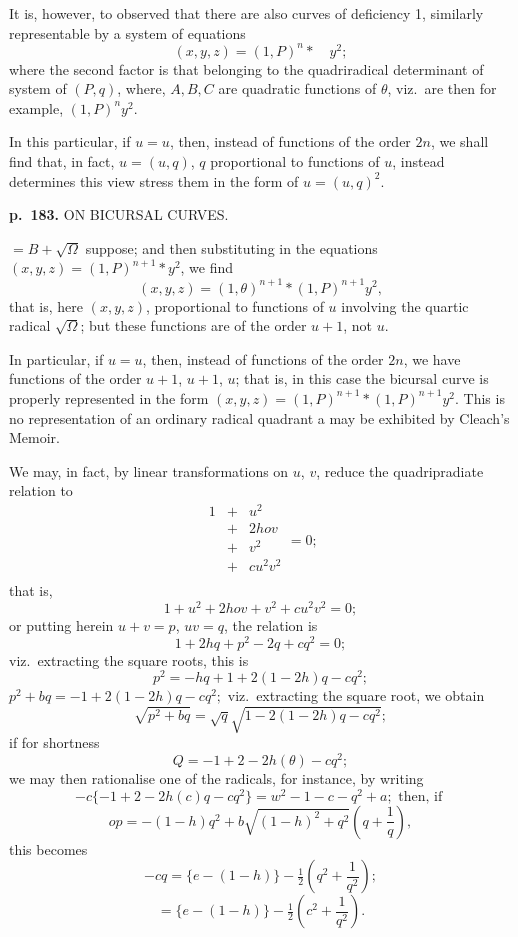 \documentclass[11pt,a4paper]{article}
\begin{document}
It is, however, to observed that there are also curves of deficiency 1, similarly representable by a system of equations
\[
(x, y, z) = (1, P)^n \ast \quad y^2;
\]
where the second factor is that belonging to the quadriradical determinant of system of $(P, q)$, where, $A, B, C$ are quadratic functions of $\theta$, viz.\ are then for example, $(1, P)^n y^2$.

In this particular, if $u = u$, then, instead of functions of the order $2n$, we shall find that, in fact, $u = (u, q)$, $q$ proportional to functions of $u$, instead determines this view stress them in the form of $u = (u, q)^2$.

\clearpage

\noindent
\textbf{p.~183.}  ON BICURSAL CURVES.

$= B + \sqrt{\Omega}$ suppose; and then substituting in the equations $(x, y, z) = (1, P)^{n+1} \ast y^2$, we find
\[
(x, y, z) = (1, \theta)^{n+1} \ast (1, P)^{n+1} y^2,
\]
that is, here $(x, y, z)$, proportional to functions of $u$ involving the quartic radical $\sqrt{\Omega}$;
but these functions are of the order $u + 1$, not $u$.

In particular, if $u = u$, then, instead of functions of the order $2n$, we have functions of the order $u + 1$, $u + 1$, $u$; that is, in this case the bicursal curve is properly represented in the form $(x, y, z) = (1, P)^{n+1} \ast (1, P)^{n+1} y^2$.  This is no representation of an ordinary radical quadrant a may be exhibited by Cleach's Memoir.

We may, in fact, by linear transformations on $u$, $v$, reduce the quadripradiate relation to
\[
\begin{matrix}
1 & + & u^2 \\
& + & 2 hov \\
& + & v^2 \\
& + & c u^2 v^2 \\
\end{matrix} = 0;
\]
that is,
\[
1 + u^2 + 2hov + v^2 + c u^2 v^2 = 0;
\]
or putting herein $u + v = p$, $uv = q$, the relation is
\[
1 + 2hq + p^2 - 2q + c q^2 = 0;
\]
viz.\ extracting the square roots, this is
\[
p^2 = -hq + 1 + 2(1 - 2h)q - cq^2;
\]
$p^2 + bq = -1 + 2(1 - 2h)q - cq^2;$
viz.\ extracting the square root, we obtain
\[
\sqrt{p^2 + bq} = \sqrt{q}\sqrt{1 - 2(1 - 2h)q - cq^2};
\]
if for shortness
\[
Q = -1 + 2 -2h(\theta) - cq^2;
\]
we may then rationalise one of the radicals, for instance, by writing
\[
-c \{-1 + 2 - 2h(c)q - cq^2\} = w^2 - 1 - c - q^2 + a; \text{ then, if }
\]
\[
op = -(1 - h)q^2 + b \sqrt{(1 - h)^2 + q^2}\left( q + \frac{1}{q} \right),
\]
this becomes
\[
-cq = \{e - (1 - h)\} - \tfrac{1}{2}\left(q^2 + \frac{1}{q^2}\right);
\]
\[
= \{e - (1 - h)\} - \tfrac{1}{2}\left(c^2 + \frac{1}{q^2}\right).
\]
\end{document}
